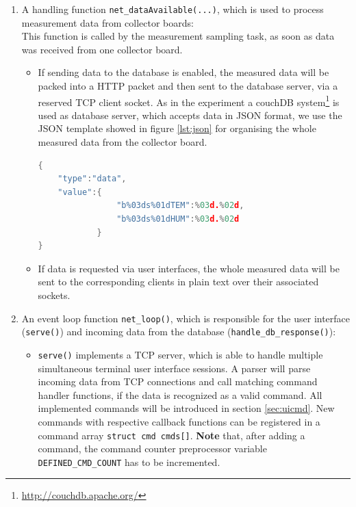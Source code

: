 \documentclass[a4paper]{scrreprt}
\begin{document}
\begin{enumerate}
  \item A handling function \texttt{net\_dataAvailable(...)}, which is used to process measurement data from collector boards:\\
    This function is called by the measurement sampling task, as soon as data was received from one collector board.
    \begin{itemize}
    \item If sending data to the database is enabled,
    the measured data will be packed into a HTTP packet and then sent to the database
    server, via a reserved TCP client socket.
    As in the experiment a couchDB system\footnote{\url{http://couchdb.apache.org/}} is used as database server,
    which accepts data in JSON format, we use the JSON template showed in figure \ref{lst:json} for organising the whole measured data from the collector board. 
\lstset{style=mathstyle}
\begin{lstlisting}[language=c,xleftmargin=70pt, xrightmargin=70pt,framexleftmargin=10pt,framextopmargin=10pt, framexbottommargin=10pt, caption={JSON template for sending data to the couchDB data base},label={lst:json}]
{
    "type":"data",
    "value":{
                "b%03ds%01dTEM":%03d.%02d,
                "b%03ds%01dHUM":%03d.%02d
            }
}
\end{lstlisting}
    \item If data is requested via user interfaces, the whole measured data will be sent to the corresponding clients in plain text over their associated sockets.
\end{itemize}
  \item An event loop function \texttt{net\_loop()}, which is responsible for the user interface (\texttt{serve()}) and incoming data from the database (\texttt{handle\_db\_response()}):
      \begin{itemize}
          \item \texttt{serve()} implements a TCP server, which is able to handle multiple simultaneous terminal user interface sessions.
A parser will parse incoming data from TCP connections and call matching command handler functions, if the data is recognized as a valid command.
All implemented commands will be introduced in section \ref{sec:uicmd}.
New commands with respective callback functions can be registered in a command array \texttt{struct cmd cmds[]}. \textbf{Note} that, after adding a command, the command counter preprocessor variable \texttt{DEFINED\_CMD\_COUNT} has to be incremented.\\

\end{itemize}
\end{enumerate}
\end{document}
